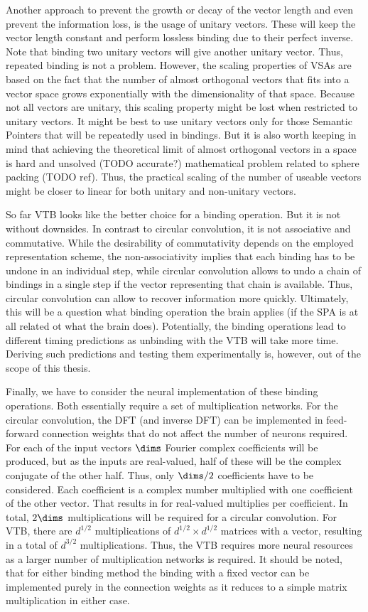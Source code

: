 Another approach to prevent the growth or decay of the vector length and even prevent the information loss, is the usage of unitary vectors.
These will keep the vector length constant and perform lossless binding due to their perfect inverse.
Note that binding two unitary vectors will give another unitary vector.
Thus, repeated binding is not a problem.
However, the scaling properties of VSAs are based on the fact that the number of almost orthogonal vectors that fits into a vector space grows exponentially with the dimensionality of that space.
Because not all vectors are unitary, this scaling property might be lost when restricted to unitary vectors.
It might be best to use unitary vectors only for those Semantic Pointers that will be repeatedly used in bindings.
But it is also worth keeping in mind that achieving the theoretical limit of almost orthogonal vectors in a space is hard and unsolved (TODO accurate?) mathematical problem related to sphere packing (TODO ref).
Thus, the practical scaling of the number of useable vectors might be closer to linear for both unitary and non-unitary vectors.

So far VTB looks like the better choice for a binding operation.
But it is not without downsides.
In contrast to circular convolution, it is not associative and commutative.
While the desirability of commutativity depends on the employed representation scheme, the non-associativity implies that each binding has to be undone in an individual step, while circular convolution allows to undo a chain of bindings in a single step if the vector representing that chain is available.
Thus, circular convolution can allow to recover information more quickly.
Ultimately, this will be a question what binding operation the brain applies (if the SPA is at all related ot what the brain does).
Potentially, the binding operations lead to different timing predictions as unbinding with the VTB will take more time.
Deriving such predictions and testing them experimentally is, however, out of the scope of this thesis.

Finally, we have to consider the neural implementation of these binding operations.
Both essentially require a set of multiplication networks.
For the circular convolution, the DFT (and inverse DFT) can be implemented in feed-forward connection weights that do not affect the number of neurons required.
For each of the input vectors $\dims$ Fourier complex coefficients will be produced, but as the inputs are real-valued, half of these will be the complex conjugate of the other half.
Thus, only $\dims / 2$ coefficients have to be considered.
Each coefficient is a complex number multiplied with one coefficient of the other vector.
That results in for real-valued multiplies per coefficient.
In total, $2\dims$ multiplications will be required for a circular convolution.
For VTB, there are $d^{1/2}$ multiplications of $d^{1/2} \times d^{1/2}$ matrices with a vector, resulting in a total of $d^{3/2}$ multiplications.
Thus, the VTB requires more neural resources as a larger number of multiplication networks is required.
It should be noted, that for either binding method the binding with a fixed vector can be implemented purely in the connection weights as it reduces to a simple matrix multiplication in either case.

